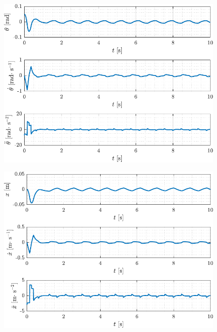 
\begin{figure}[H]\vspace{-2cm}
  \includegraphics[width=\textwidth]{figures/slidingModeSIMtheta}
\end{figure}
\vspace{-.2cm}
\begin{figure}[H]
  \includegraphics[width=\textwidth]{figures/slidingModeSIMx}
\end{figure}

